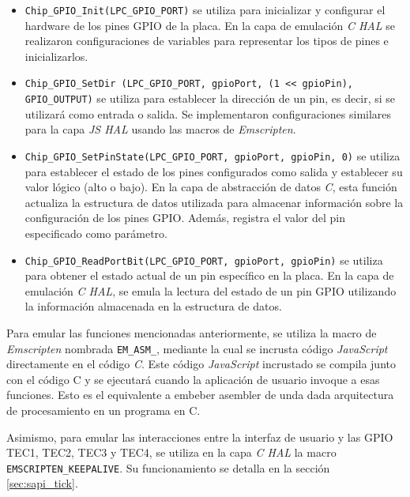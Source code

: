 \begin{itemize}
	\item \texttt{Chip\_GPIO\_Init(LPC\_GPIO\_PORT)} se utiliza para inicializar y configurar el hardware de los pines GPIO de la placa. En la capa de emulación \textit{C HAL} se realizaron configuraciones de variables para representar los tipos de pines e inicializarlos.
	
	\item \texttt{Chip\_GPIO\_SetDir (LPC\_GPIO\_PORT, gpioPort, \newline (1 \<<\<<  gpioPin), GPIO\_OUTPUT)} se utiliza para establecer la dirección de un pin, es decir, si se utilizará como entrada o salida. Se implementaron configuraciones similares para la capa \textit{JS HAL} usando las macros de \textit{Emscripten}.
	
	\item \texttt{Chip\_GPIO\_SetPinState(LPC\_GPIO\_PORT, gpioPort, \newline gpioPin, 0)} se utiliza para establecer el estado de los pines configurados como salida y establecer su valor lógico (alto o bajo). En la capa de abstracción de datos \textit{C}, esta función actualiza la estructura de datos utilizada para almacenar información sobre la configuración de los pines GPIO. Además, registra el valor del pin especificado como parámetro.

	\item \texttt{Chip\_GPIO\_ReadPortBit(LPC\_GPIO\_PORT, gpioPort, \newline gpioPin)} se utiliza para obtener el estado actual de un pin específico en la placa. En la capa de emulación \textit{C HAL}, se emula la lectura del estado de un pin GPIO utilizando la información almacenada en la estructura de datos.
\end{itemize}

Para emular las funciones mencionadas anteriormente, se utiliza la macro de \textit{Emscripten} nombrada \texttt{EM\_ASM\_}, mediante la cual se incrusta código \textit{JavaScript} directamente en el código \textit{C}. Este código \textit{JavaScript} incrustado se compila junto con el código C y se ejecutará cuando la aplicación de usuario invoque a esas funciones. Esto es el equivalente a embeber asembler de unda dada arquitectura de procesamiento en un programa en C.

Asimismo, para emular las interacciones entre la interfaz de usuario y las GPIO TEC1, TEC2, TEC3 y TEC4, se utiliza en la capa \textit{C HAL} la macro \newline \texttt{EMSCRIPTEN\_KEEPALIVE}. Su funcionamiento se detalla en la sección \ref{sec:sapi_tick}. 

